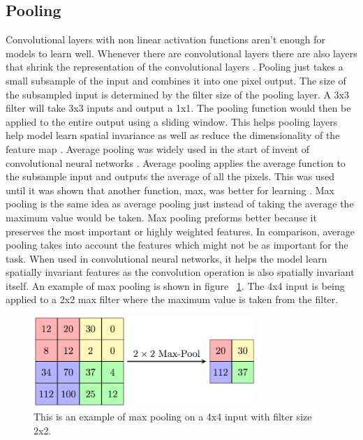 \subsection{Pooling}
    Convolutional layers with non linear activation functions aren't enough for models to learn well. 
    Whenever there are convolutional layers there are also layers that shrink the representation of the convolutional layers \cite{Lee:2011:ULH:2001269.2001295}. 
    Pooling just takes a small subsample of the input and combines it into one pixel output. 
    The size of the subsampled input is determined by the filter size of the pooling layer. 
    A 3x3 filter will take 3x3 inputs and output a 1x1. 
    The pooling function would then be applied to the entire output using a sliding window. 
    This helps pooling layers help model learn spatial invariance as well as reduce the dimensionality of the feature map \cite{Scherer:2010:EPO:1886436.1886447}. 
    Average pooling was widely used in the start of invent of convolutional neural networks \cite{NIPS2012_Krizhevsky}. 
    Average pooling applies the average function to the subsample input and outputs the average of all the pixels. 
    This was used until it was shown that another function, max, was better for learning \cite{Scherer:2010:EPO:1886436.1886447}. 
    Max pooling is the same idea as average pooling just instead of taking the average the maximum value would be taken. 
    Max pooling preforms better because it preserves the most important or highly weighted features. 
    In comparison, average pooling takes into account the features which might not be as important for the task.
    When used in convolutional neural networks, it helps the model learn spatially invariant features as the convolution operation is also spatially invariant itself. 
    An example of max pooling is shown in figure ~\ref{fig_max_pool}. 
    The 4x4 input is being applied to a 2x2 max filter where the maximum value is taken from the filter. 

\begin{figure}[tbh]
\centering
\includegraphics[width=0.75\textwidth]{max_pooling.png}
\caption{ This is an example of max pooling on a 4x4 input with filter size 2x2.   }
\label{fig_max_pool}
\end{figure} 

